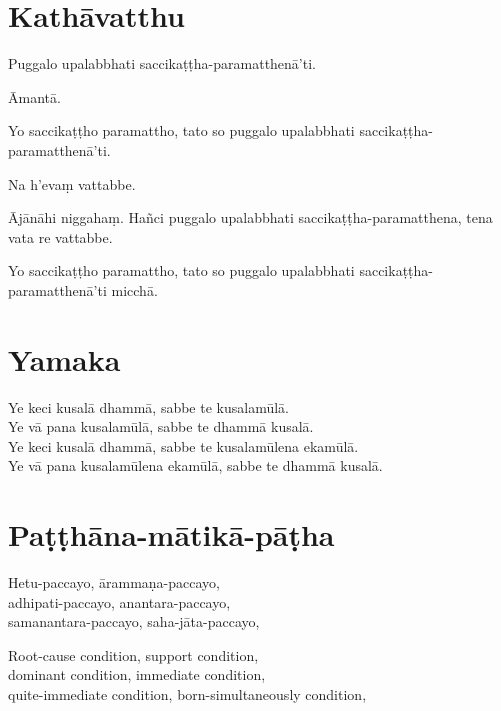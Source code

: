 

\section{Kathāvatthu}

Puggalo upalabbhati saccikaṭṭha-paramatthenā'ti.

Āmantā.

Yo saccikaṭṭho paramattho, tato so puggalo upalabbhati
saccikaṭṭha-paramatthenā'ti.

Na h’evaṃ vattabbe.

Ājānāhi niggahaṃ. Hañci puggalo upalabbhati
saccikaṭṭha-paramatthena, tena vata re vattabbe.

Yo saccikaṭṭho paramattho, tato so puggalo upalabbhati
saccikaṭṭha-paramatthenā'ti micchā.



\section{Yamaka}

Ye keci kusalā dhammā, sabbe te kusalamūlā.\\ 
Ye vā pana kusalamūlā, sabbe te dhammā kusalā.\\
Ye keci kusalā dhammā, sabbe te kusalamūlena ekamūlā.\\ 
Ye vā pana kusalamūlena ekamūlā, sabbe te dhammā kusalā.



\section{Paṭṭhāna-mātikā-pāṭha}



Hetu-paccayo, ārammaṇa-paccayo,\\
adhipati-paccayo, anantara-paccayo,\\
samanantara-paccayo, saha-jāta-paccayo,

\begin{english}
  Root-cause condition, support condition,\\
  dominant condition, immediate condition,\\
  quite-immediate condition, born-simultaneously condition,
\end{english}

